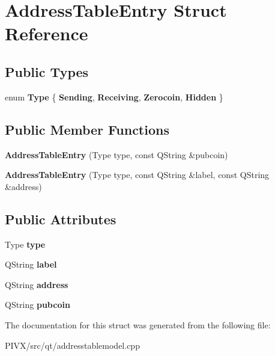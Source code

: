 \hypertarget{struct_address_table_entry}{}\section{Address\+Table\+Entry Struct Reference}
\label{struct_address_table_entry}
\subsection*{Public Types}
\begin{DoxyCompactItemize}
\item 
\mbox{\label{struct_address_table_entry_afe73719f8e77468e712ed9006f437639}} 
enum {\bfseries Type} \{ {\bfseries Sending}, 
{\bfseries Receiving}, 
{\bfseries Zerocoin}, 
{\bfseries Hidden}
 \}
\end{DoxyCompactItemize}
\subsection*{Public Member Functions}
\begin{DoxyCompactItemize}
\item 
\mbox{\label{struct_address_table_entry_aef5443951ad7fbfd01493a3443f09e20}} 
{\bfseries Address\+Table\+Entry} (Type type, const Q\+String \&pubcoin)
\item 
\mbox{\label{struct_address_table_entry_a49b13433cb41b3af9ceb83a535fc2ea5}} 
{\bfseries Address\+Table\+Entry} (Type type, const Q\+String \&label, const Q\+String \&address)
\end{DoxyCompactItemize}
\subsection*{Public Attributes}
\begin{DoxyCompactItemize}
\item 
\mbox{\label{struct_address_table_entry_a2e782e5239a5adae62eaa81746f55314}} 
Type {\bfseries type}
\item 
\mbox{\label{struct_address_table_entry_a4a427495652b7716f84aa88b2cb4f296}} 
Q\+String {\bfseries label}
\item 
\mbox{\label{struct_address_table_entry_ae36a700ca64a079d26f8aedce1ad9155}} 
Q\+String {\bfseries address}
\item 
\mbox{\label{struct_address_table_entry_a4853d255deca7286e7454fcd09b41ea3}} 
Q\+String {\bfseries pubcoin}
\end{DoxyCompactItemize}


The documentation for this struct was generated from the following file\+:\begin{DoxyCompactItemize}
\item 
P\+I\+V\+X/src/qt/addresstablemodel.\+cpp\end{DoxyCompactItemize}
